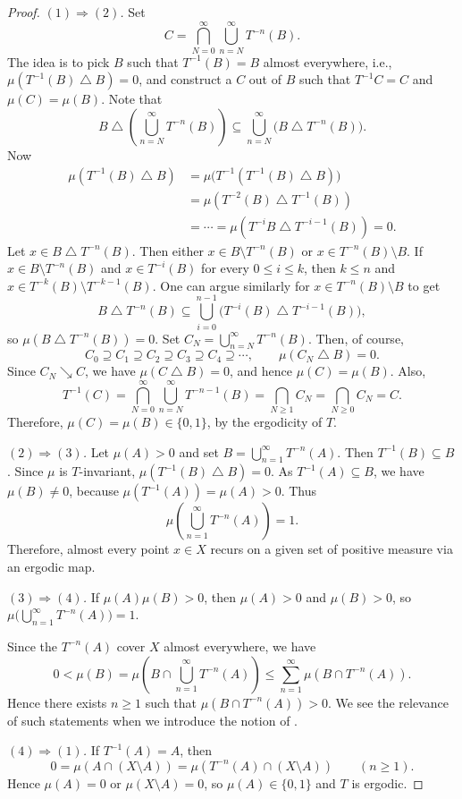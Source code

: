 \documentclass[11pt,a4paper]{article}
\begin{document}
\begin{proof}
\emph{$(1)\Rightarrow(2)$.} Set
\[
  C=\bigcap_{N=0}^{\infty}\bigcup_{n=N}^{\infty}T^{-n}(B).
\]
The idea is to pick $B$ such that $T^{-1}(B)=B$ almost everywhere, i.e.,
$\mu(T^{-1}(B)\mathbin\triangle B)=0$, and construct a $C$ out of $B$ such that
$T^{-1}C=C$ and $\mu(C)=\mu(B)$. Note that
\[
  B\mathbin\triangle\left(\bigcup_{n=N}^{\infty}T^{-n}(B)\right)
  \subseteq\bigcup_{n=N}^{\infty}\bigl(B\mathbin\triangle T^{-n}(B)\bigr).
\]
Now
\begin{align*}
  \mu(T^{-1}(B)\mathbin\triangle B)
  &=\mu\bigl(T^{-1}(T^{-1}(B)\mathbin\triangle B)\bigr)\\
  &=\mu(T^{-2}(B)\mathbin\triangle T^{-1}(B))\\
  &=\cdots=\mu(T^{-i}B\mathbin\triangle T^{-i-1}(B))=0.
\end{align*}
Let $x\in B\mathbin\triangle T^{-n}(B)$. Then either
$x\in B\setminus T^{-n}(B)$ or $x\in T^{-n}(B)\setminus B$.
If $x\in B\setminus T^{-n}(B)$ and $x\in T^{-i}(B)$ for every
$0\leq i\leq k$, then $k\leq n$ and
$x\in T^{-k}(B)\setminus T^{-k-1}(B)$. One can argue similarly for
$x\in T^{-n}(B)\setminus B$ to get
\[
  B\mathbin\triangle T^{-n}(B)
  \subseteq\bigcup_{i=0}^{n-1}\bigl(T^{-i}(B)\mathbin\triangle T^{-i-1}(B)\bigr),
\]
so $\mu(B\mathbin\triangle T^{-n}(B))=0$.
Set $C_N=\bigcup_{n=N}^{\infty}T^{-n}(B)$. Then, of course,
\[
  C_0\supseteq C_1\supseteq C_2\supseteq C_3\supseteq C_4\supseteq\cdots,
  \qquad \mu(C_N\mathbin\triangle B)=0.
\]
Since $C_N\searrow C$, we have $\mu(C\mathbin\triangle B)=0$, and hence
$\mu(C)=\mu(B)$. Also,
\[
  T^{-1}(C)=\bigcap_{N=0}^{\infty}\bigcup_{n=N}^{\infty}T^{-n-1}(B)
  =\bigcap_{N\geq1}C_N=\bigcap_{N\geq0}C_N=C.
\]
Therefore, $\mu(C)=\mu(B)\in\{0,1\}$, by the ergodicity of $T$.

\emph{$(2)\Rightarrow(3)$.} Let $\mu(A)>0$ and set
$B=\bigcup_{n=1}^{\infty}T^{-n}(A)$. Then $T^{-1}(B)\subseteq B$.
Since $\mu$ is $T$-invariant, $\mu(T^{-1}(B)\mathbin\triangle B)=0$.
As $T^{-1}(A)\subseteq B$, we have $\mu(B)\neq0$, because
$\mu(T^{-1}(A))=\mu(A)>0$. Thus
\[
  \mu\left(\bigcup_{n=1}^{\infty}T^{-n}(A)\right)=1.
\]
Therefore, almost every point $x\in X$ recurs on a given set of positive measure via
an ergodic map.

\emph{$(3)\Rightarrow(4)$.} If $\mu(A)\mu(B)>0$, then $\mu(A)>0$ and
$\mu(B)>0$, so $\mu\bigl(\bigcup_{n=1}^{\infty}T^{-n}(A)\bigr)=1$.

Since the $T^{-n}(A)$ cover $X$ almost everywhere, we have
\[
  0<\mu(B)=\mu\left(B\cap\bigcup_{n=1}^{\infty}T^{-n}(A)\right)
  \leq\sum_{n=1}^{\infty}\mu(B\cap T^{-n}(A)).
\]
Hence there exists $n\geq1$ such that $\mu(B\cap T^{-n}(A))>0$.
We see the relevance of such statements when we introduce the notion of
.

\emph{$(4)\Rightarrow(1)$.} If $T^{-1}(A)=A$, then
\[
  0=\mu(A\cap(X\setminus A))
  =\mu(T^{-n}(A)\cap(X\setminus A))\qquad(n\geq1).
\]
Hence $\mu(A)=0$ or $\mu(X\setminus A)=0$, so $\mu(A)\in\{0,1\}$ and $T$ is
ergodic.
\end{proof}
\end{document}
